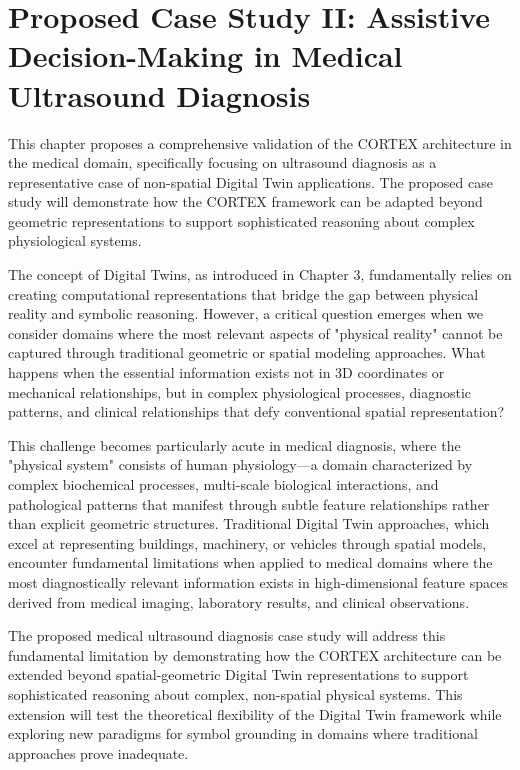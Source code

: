 
\chapter{Proposed Case Study II: Assistive Decision-Making in Medical Ultrasound Diagnosis} \label{chp:medical}

This chapter proposes a comprehensive validation of the CORTEX architecture in the medical domain, specifically focusing on ultrasound diagnosis as a representative case of non-spatial Digital Twin applications. The proposed case study will demonstrate how the CORTEX framework can be adapted beyond geometric representations to support sophisticated reasoning about complex physiological systems.

The concept of Digital Twins, as introduced in Chapter 3, fundamentally relies on creating computational representations that bridge the gap between physical reality and symbolic reasoning. However, a critical question emerges when we consider domains where the most relevant aspects of "physical reality" cannot be captured through traditional geometric or spatial modeling approaches. What happens when the essential information exists not in 3D coordinates or mechanical relationships, but in complex physiological processes, diagnostic patterns, and clinical relationships that defy conventional spatial representation?

This challenge becomes particularly acute in medical diagnosis, where the "physical system" consists of human physiology—a domain characterized by complex biochemical processes, multi-scale biological interactions, and pathological patterns that manifest through subtle feature relationships rather than explicit geometric structures. Traditional Digital Twin approaches, which excel at representing buildings, machinery, or vehicles through spatial models, encounter fundamental limitations when applied to medical domains where the most diagnostically relevant information exists in high-dimensional feature spaces derived from medical imaging, laboratory results, and clinical observations.

The proposed medical ultrasound diagnosis case study will address this fundamental limitation by demonstrating how the CORTEX architecture can be extended beyond spatial-geometric Digital Twin representations to support sophisticated reasoning about complex, non-spatial physical systems. This extension will test the theoretical flexibility of the Digital Twin framework while exploring new paradigms for symbol grounding in domains where traditional approaches prove inadequate.

